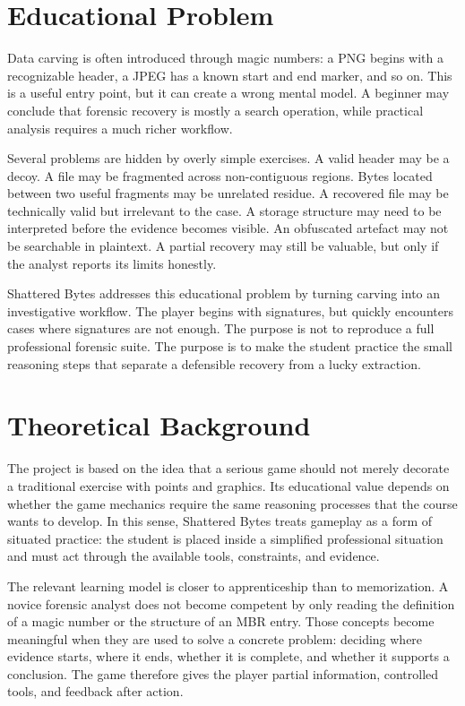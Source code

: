 \documentclass[11pt,a4paper]{article}
\newcommand{\projecttitle}{Shattered Bytes}
\begin{document}
\section{Educational Problem}

Data carving is often introduced through magic numbers: a PNG begins with a recognizable header, a JPEG has a known start and end marker, and so on. This is a useful entry point, but it can create a wrong mental model. A beginner may conclude that forensic recovery is mostly a search operation, while practical analysis requires a much richer workflow.

Several problems are hidden by overly simple exercises. A valid header may be a decoy. A file may be fragmented across non-contiguous regions. Bytes located between two useful fragments may be unrelated residue. A recovered file may be technically valid but irrelevant to the case. A storage structure may need to be interpreted before the evidence becomes visible. An obfuscated artefact may not be searchable in plaintext. A partial recovery may still be valuable, but only if the analyst reports its limits honestly.

\projecttitle{} addresses this educational problem by turning carving into an investigative workflow. The player begins with signatures, but quickly encounters cases where signatures are not enough. The purpose is not to reproduce a full professional forensic suite. The purpose is to make the student practice the small reasoning steps that separate a defensible recovery from a lucky extraction.

\section{Theoretical Background}

The project is based on the idea that a serious game should not merely decorate a traditional exercise with points and graphics. Its educational value depends on whether the game mechanics require the same reasoning processes that the course wants to develop. In this sense, \projecttitle{} treats gameplay as a form of situated practice: the student is placed inside a simplified professional situation and must act through the available tools, constraints, and evidence.

The relevant learning model is closer to apprenticeship than to memorization. A novice forensic analyst does not become competent by only reading the definition of a magic number or the structure of an MBR entry. Those concepts become meaningful when they are used to solve a concrete problem: deciding where evidence starts, where it ends, whether it is complete, and whether it supports a conclusion. The game therefore gives the player partial information, controlled tools, and feedback after action.
\end{document}
